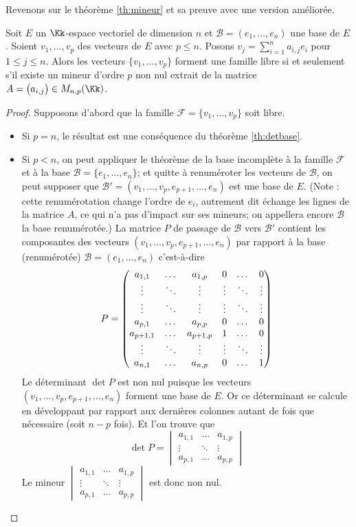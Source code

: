 \documentclass[class=report,crop=false]{standalone}
\begin{document}
Revenons sur le théorème \ref{th:mineur}
et sa preuve avec une version améliorée.

\begin{theoreme}
Soit $E$ un $\Kk$-espace vectoriel de dimension $n$ et $\mathcal{B} = (e_1, \dots ,e_n)$
une base de $E$. Soient $v_{1}, \dots ,v_{p}$ des vecteurs de $E$ avec $p \le n$.
Posons $v_j=\sum_{i=1}^{n} a_{i,j}e_i$ pour $1 \le j \le n$. Alors les
vecteurs $\{ v_1, \ldots, v_p \}$ forment une famille libre si
et seulement s'il existe un mineur d'ordre $p$ non nul extrait de la
matrice $A = \big(a_{i,j}\big) \in M_{n,p}(\Kk)$.
\end{theoreme}


\begin{proof}
Supposons d'abord que la famille  $\mathcal{F} = \{ v_1,\ldots ,v_p \}$ soit libre.
\begin{itemize}
\item Si $p=n$, le résultat est une conséquence du théorème \ref{th:detbase}.

\item Si $p<n$, on peut appliquer le théorème de la base incomplète à la famille $\mathcal{F}$
et à la base $\mathcal{B} = \{e_1,\ldots,e_n \}$; et quitte à renuméroter les vecteurs de $\mathcal{B}$,
on peut supposer que $\mathcal{B}' = (v_1, \ldots ,v_p,e_{p+1},\ldots ,e_{n})$ est une base de $E$.
(Note : cette renumérotation change l'ordre de $e_i$, autrement dit échange les lignes de
la matrice $A$, ce qui n'a pas d'impact sur ses mineurs; on appellera encore $\mathcal{B}$ la base
renumérotée.)
La matrice $P$ de passage de $\mathcal{B}$ vers $\mathcal{B}'$ contient
les composantes des vecteurs $(v_1, \ldots ,v_p,e_{p+1},\ldots ,e_{n})$ par rapport à
la base (renumérotée) $\mathcal{B} = (e_1,\ldots,e_n)$ c'est-à-dire
\[
P = \begin{pmatrix}
a_{1,1}& \dots & a_{1,p}& 0 & \dots & 0 \cr
\vdots & \ddots& \vdots & \vdots & \ddots & \vdots   \cr
\vdots & \ddots& \vdots & \vdots & \ddots & \vdots   \cr
a_{p,1}& \dots & a_{p,p}& 0& \dots & 0 \cr
a_{p+1,1}& \dots & a_{p+1,p}& 1& \dots & 0 \cr
\vdots & \ddots & \vdots & \vdots & \ddots & \vdots \cr
a_{n,1}& \dots &a_{n,p}& 0 & \dots & 1\cr
\end{pmatrix}
\]
Le déterminant $\det P$ est non nul puisque les vecteurs
$(v_1, \ldots ,v_p,e_{p+1},\ldots ,e_{n})$ forment une base
de $E$. Or ce déterminant se calcule en développant par
rapport aux dernières colonnes autant de fois que nécessaire (soit $n-p$ fois).
Et l'on trouve que
\[
\det P = \begin{vmatrix}
a_{1,1}& \dots & a_{1,p}\\
\vdots & \ddots& \vdots  \\
a_{p,1}& \dots & a_{p,p}
\end{vmatrix}
\]
Le mineur $\begin{vmatrix}
a_{1,1}& \dots & a_{1,p}\\
\vdots & \ddots& \vdots  \\
a_{p,1}& \dots & a_{p,p}
\end{vmatrix}$ est donc non nul.


\end{itemize}
\end{proof}
\end{document}
